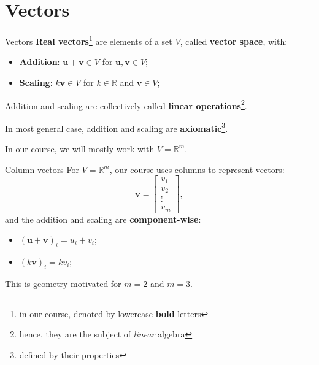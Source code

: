 \documentclass[10pt]{beamer}
\begin{document}
\section{Vectors}
\begin{frame}{Vectors}
    \textbf{Real vectors}\footnote{in our course, denoted by lowercase \textbf{bold} letters} are elements of a set $V$, called \textbf{vector space}, with:

    \begin{itemize}
        \item \textbf{Addition}: $\mathbf{u} + \mathbf{v} \in V$ for $\mathbf{u}, \mathbf{v} \in V$;
        \item \textbf{Scaling}: $k \mathbf{v} \in V$ for $k \in \mathbb R$ and $\mathbf{v} \in V$;
    \end{itemize}

    Addition and scaling are collectively called \textbf{linear operations}\footnote{hence, they are the subject of \textit{linear} algebra}.

    In most general case, addition and scaling are \textbf{axiomatic}\footnote{defined by their properties}.

    In our course, we will mostly work with $V = \mathbb R^m$.
\end{frame}

\begin{frame}{Column vectors}
    For $V = \mathbb R^m$, our course uses columns to represent vectors:
    $$
    \mathbf v = \begin{bmatrix}
        v_1 \\ v_2 \\ \vdots \\ v_m
    \end{bmatrix},
    $$
    and the addition and scaling are \textbf{component-wise}:
    \begin{itemize}
        \item $(\mathbf u + \mathbf v)_i = u_i + v_i$;
        \item $(k \mathbf v)_i = k v_i$;
    \end{itemize}

    This is geometry-motivated for $m=2$ and $m=3$.
\end{frame}
\end{document}
